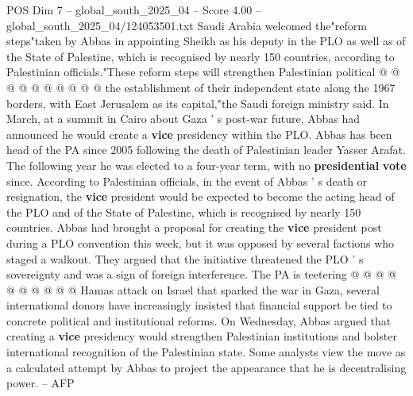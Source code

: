 \begin{textsample}{POS Dim 7 – global\_south\_2025\_04 – Score 4.00 – global\_south\_2025\_04/124053501.txt}
Saudi Arabia welcomed the"reform steps"taken by Abbas in appointing Sheikh as his deputy in the PLO as well as of the State of Palestine, which is recognised by nearly 150 countries, according to Palestinian officials."These reform steps will strengthen Palestinian political @ @ @ @ @ @ @ @ @ @ the establishment of their independent state along the 1967 borders, with East Jerusalem as its capital,"the Saudi foreign ministry said.
In March, at a summit in Cairo about Gaza ' s post-war future, Abbas had announced he would create a \textbf{vice} presidency within the PLO.
Abbas has been head of the PA since 2005 following the death of Palestinian leader Yasser Arafat.
The following year he was elected to a four-year term, with no \textbf{presidential} \textbf{vote} since.
According to Palestinian officials, in the event of Abbas ' s death or resignation, the \textbf{vice} president would be expected to become the acting head of the PLO and of the State of Palestine, which is recognised by nearly 150 countries.
Abbas had brought a proposal for creating the \textbf{vice} president post during a PLO convention this week, but it was opposed by several factions who staged a walkout.
They argued that the initiative threatened the PLO ' s sovereignty and was a sign of foreign interference.
The PA is teetering @ @ @ @ @ @ @ @ @ @ Hamas attack on Israel that sparked the war in Gaza, several international donors have increasingly insisted that financial support be tied to concrete political and institutional reforms.
On Wednesday, Abbas argued that creating a \textbf{vice} presidency would strengthen Palestinian institutions and bolster international recognition of the Palestinian state.
Some analysts view the move as a calculated attempt by Abbas to project the appearance that he is decentralising power. -- AFP

\end{textsample}
